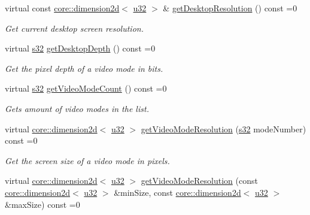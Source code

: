 \begin{DoxyCompactItemize}
virtual const \hyperlink{classirr_1_1core_1_1dimension2d}{core\+::dimension2d}$<$ \hyperlink{namespaceirr_a0416a53257075833e7002efd0a18e804}{u32} $>$ \& \hyperlink{classirr_1_1video_1_1IVideoModeList_ade99f99922307c1d539bdd35834361fa}{get\+Desktop\+Resolution} () const =0
\begin{DoxyCompactList}\small\item\em Get current desktop screen resolution. \end{DoxyCompactList}\item 
virtual \hyperlink{namespaceirr_ac66849b7a6ed16e30ebede579f9b47c6}{s32} \hyperlink{classirr_1_1video_1_1IVideoModeList_a15869ac6919f6f29d2a25fcf13b6dd45}{get\+Desktop\+Depth} () const =0
\begin{DoxyCompactList}\small\item\em Get the pixel depth of a video mode in bits. \end{DoxyCompactList}\item 
virtual \hyperlink{namespaceirr_ac66849b7a6ed16e30ebede579f9b47c6}{s32} \hyperlink{classirr_1_1video_1_1IVideoModeList_a84326f1c6faa1cbbb6f90bdac66714dd}{get\+Video\+Mode\+Count} () const =0
\begin{DoxyCompactList}\small\item\em Gets amount of video modes in the list. \end{DoxyCompactList}\item 
virtual \hyperlink{classirr_1_1core_1_1dimension2d}{core\+::dimension2d}$<$ \hyperlink{namespaceirr_a0416a53257075833e7002efd0a18e804}{u32} $>$ \hyperlink{classirr_1_1video_1_1IVideoModeList_af8409c756780c3566c94596cf7f94fc3}{get\+Video\+Mode\+Resolution} (\hyperlink{namespaceirr_ac66849b7a6ed16e30ebede579f9b47c6}{s32} mode\+Number) const =0
\begin{DoxyCompactList}\small\item\em Get the screen size of a video mode in pixels. \end{DoxyCompactList}\item 
virtual \hyperlink{classirr_1_1core_1_1dimension2d}{core\+::dimension2d}$<$ \hyperlink{namespaceirr_a0416a53257075833e7002efd0a18e804}{u32} $>$ \hyperlink{classirr_1_1video_1_1IVideoModeList_aa06b5905ac9c04fb38a17bf798fccc9b}{get\+Video\+Mode\+Resolution} (const \hyperlink{classirr_1_1core_1_1dimension2d}{core\+::dimension2d}$<$ \hyperlink{namespaceirr_a0416a53257075833e7002efd0a18e804}{u32} $>$ \&min\+Size, const \hyperlink{classirr_1_1core_1_1dimension2d}{core\+::dimension2d}$<$ \hyperlink{namespaceirr_a0416a53257075833e7002efd0a18e804}{u32} $>$ \&max\+Size) const =0

\end{DoxyCompactItemize}
